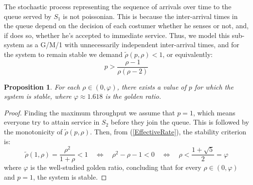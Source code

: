 \documentclass[11pt]{article}
\numberwithin{equation}{section}
\newtheorem{proposition}{Proposition}[section]
\begin{document}
The stochastic process representing the sequence of arrivals over time to the queue served by $S_{1}$ is not poissonian. This is because the inter-arrival times in the queue depend on the decision of each costumer whether he senses or not, and, if does so, whether he's accepted to immediate service. Thus, we model this sub-system as a G/M/1 with unnecessarily independent inter-arrival times, and for the system to remain stable we demand $\tilde{\rho}(p,\rho) < 1$, or equivalently:
\[ p>\frac{\rho - 1}{\rho(\rho-2)} \]

\begin{proposition}
For each $\rho\in(0,\varphi)$, there exists a value of $p$ for which the system is stable, where
$\varphi \approx 1.618$ is the golden ratio.
\end{proposition}

\begin{proof}
Finding the maximum throughput we assume that $p=1$, which means everyone try to attain service in $S_{2}$ before they join the queue. This is followed by the monotonicity of $\tilde{\rho}(p,\rho)$. Then, from (\ref{EffectiveRate}), the stability criterion is:
\[ \tilde{\rho}(1,\rho)=\frac{\rho^2}{1+\rho}<1 \quad\Leftrightarrow\quad \rho^2-\rho-1<0 \quad\Leftrightarrow\quad \rho < \frac{1+\sqrt{5}}{2}=\varphi \]
where $\varphi$ is the well-studied golden ratio, concluding that for every $\rho\in(0,\varphi)$ and $p=1$, the system is stable.
\end{proof}

\newpage
\end{document}
